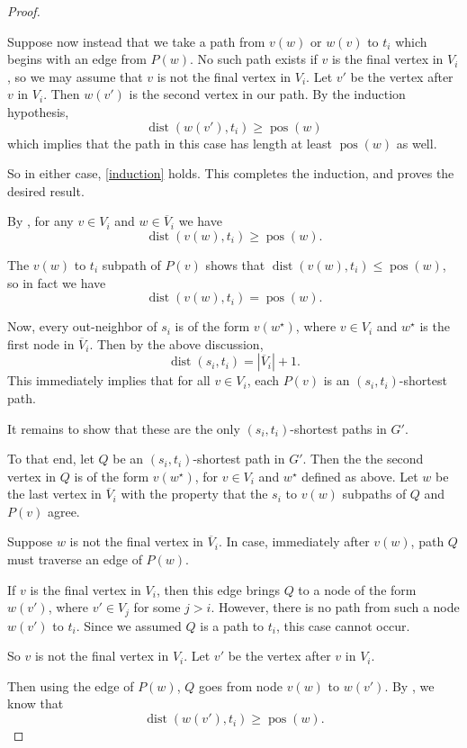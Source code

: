 \documentclass[11pt]{article}
\DeclareMathOperator{\dist}{dist}
\renewcommand{\bar}{\overline}
\DeclareMathOperator{\pos}{pos}
\theoremstyle{definition}
\begin{document}
\begin{proof}
\begin{claimproof}
Suppose now instead that we take a path from $v(w)$ or $w(v)$ to $t_i$ which begins with an edge from $P(w)$.
No such path exists if $v$ is the final vertex in $V_i$, so we may assume that $v$ is not the final vertex in $V_i$.
Let $v'$ be the vertex after $v$ in $V_i$.
Then $w(v')$ is the second vertex in our path.
By the induction hypothesis, 
\[\dist(w(v'),t_i)\ge \pos(w)\]
which implies that the path in this case has length at least $\pos(w)$ as well.

So in either case, \cref{induction} holds.
This completes the induction, and proves the desired result.
\end{claimproof}

By , for any $v\in V_i$ and $w\in\bar{V}_i$ we have 
    \[\dist(v(w),t_i)\ge \pos(w).\]

The $v(w)$ to $t_i$ subpath of $P(v)$ shows that $\dist(v(w),t_i)\le \pos(w)$, so in fact we have 
    \[\dist(v(w),t_i)= \pos(w).\]

Now, every out-neighbor of $s_i$ is of the form $v(w^\star)$, where $v\in V_i$ and $w^\star$ is the first node in $\bar{V}_i$.
Then by the above discussion,
    \begin{equation}
    \label{eq:sp-length}
    \dist(s_i,t_i) = |\bar{V}_i| + 1.
    \end{equation}
This immediately implies that for all $v\in V_i$, each $P(v)$ is an $(s_i,t_i)$-shortest path.

It remains to show that these are the only $(s_i,t_i)$-shortest paths in $G'$.

To that end, let $Q$ be an $(s_i,t_i)$-shortest path in $G'$.
Then the the second vertex in $Q$ is of the form $v(w^\star)$, for $v\in V_i$ and $w^\star$ defined as above.
Let $w$ be the last vertex in $\bar{V}_i$ with the property that the $s_i$ to $v(w)$ subpaths of $Q$ and $P(v)$ agree.

Suppose $w$ is not the final vertex in $\bar{V}_i$.
In case, immediately after $v(w)$, path $Q$ must traverse an edge of $P(w)$.

If $v$ is the final vertex in $V_i$, then this edge brings $Q$ to a node of the form $w(v')$, where $v'\in V_j$ for some $j > i$.
However, there is no path from such a node $w(v')$ to $t_i$.
Since we assumed $Q$ is a path to $t_i$, this case cannot occur.

So $v$ is not the final vertex in $V_i$.
Let $v'$ be the vertex after $v$ in $V_i$.

Then using the edge of $P(w)$, $Q$ goes from node $v(w)$ to $w(v')$.
By , we know that 
    \[\dist(w(v'),t_i)\ge \pos(w).\]


\end{proof}
\end{document}
